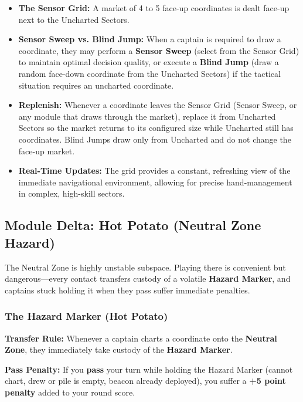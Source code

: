 \documentclass[11pt]{article}
\providecommand{\tightlist}{%
  \setlength{\itemsep}{0pt}\setlength{\parskip}{0pt}}
\begin{document}
\begin{itemize}
\tightlist
\item
  \textbf{The Sensor Grid:} A market of 4 to 5 face-up coordinates is
  dealt face-up next to the Uncharted Sectors.
\item
  \textbf{Sensor Sweep vs. Blind Jump:} When a captain is required to
  draw a coordinate, they may perform a \textbf{Sensor Sweep} (select
  from the Sensor Grid) to maintain optimal decision quality, or execute
  a \textbf{Blind Jump} (draw a random face-down coordinate from the
  Uncharted Sectors) if the tactical situation requires an uncharted
  coordinate.
\item
  \textbf{Replenish:} Whenever a coordinate leaves the Sensor Grid
  (Sensor Sweep, or any module that draws through the market), replace it
  from Uncharted Sectors so the market returns to its configured size
  while Uncharted still has coordinates. Blind Jumps draw only from
  Uncharted and do not change the face-up market.
\item
  \textbf{Real-Time Updates:} The grid provides a constant, refreshing
  view of the immediate navigational environment, allowing for precise
  hand-management in complex, high-skill sectors.
\end{itemize}

\subsection{Module Delta: Hot Potato (Neutral Zone
Hazard)}\label{module-delta-hot-potato-neutral-zone-hazard}

The Neutral Zone is highly unstable subspace. Playing there is
convenient but dangerous---every contact transfers custody of a volatile
\textbf{Hazard Marker}, and captains stuck holding it when they pass
suffer immediate penalties.

\subsubsection{The Hazard Marker (Hot
Potato)}\label{the-hazard-marker-hot-potato}

\textbf{Transfer Rule:} Whenever a captain charts a coordinate onto the
\textbf{Neutral Zone}, they immediately take custody of the
\textbf{Hazard Marker}.

\textbf{Pass Penalty:} If you \textbf{pass} your turn while holding the
Hazard Marker (cannot chart, drew or pile is empty, beacon already
deployed), you suffer a \textbf{+5 point penalty} added to your round
score.
\end{document}
